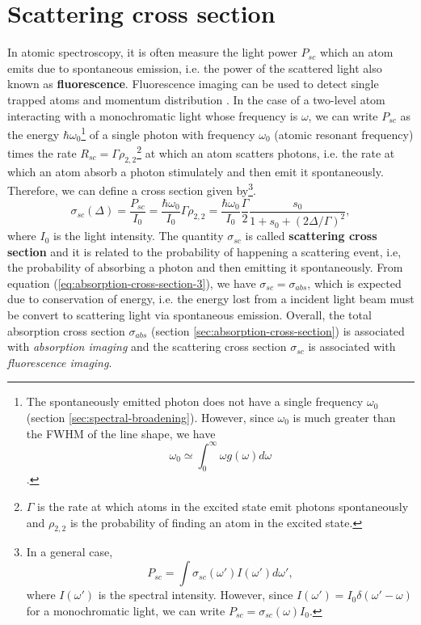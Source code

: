 %
\chapter{Scattering cross section}
\label{ap:scattering-cross-section}
%

In atomic spectroscopy, it is often measure the light power $ P_{sc} $ which an atom emits due to spontaneous emission, i.e. the power of the scattered light also known as \textbf{fluorescence}. Fluorescence imaging can be used to detect single trapped atoms \cite{kuhr2001deterministic} and momentum distribution \cite{fuhrmanek2010imaging, bucker2009single}. In the case of a two-level atom interacting with a monochromatic light whose frequency is $ \omega $, we can write $ P_{sc} $ as the energy $ \hbar \omega_0 $\footnote{The spontaneously emitted photon does not have a single frequency $ \omega_0 $ (section \ref{sec:spectral-broadening}). However, since $ \omega_0 $ is much greater than the FWHM of the line shape, we have $$ \omega_0 \simeq \int_{0}^{\infty} \omega g(\omega) d\omega $$.} of a single photon with frequency $ \omega_0 $ (atomic resonant frequency) times the rate $ R_{sc} = \Gamma \rho_{2,2} $\footnote{$ \Gamma $ is the rate at which atoms in the excited state emit photons spontaneously and $ \rho_{2,2} $ is the probability of finding an atom in the excited state.} at which an atom scatters photons, i.e. the rate at which an atom absorb a photon stimulately and then emit it spontaneously. Therefore, we can define a cross section given by\footnote{In a general case, $$ P_{sc} = \int \sigma_{sc}(\omega') I(\omega') d\omega', $$ where $ I(\omega') $ is the spectral intensity. However, since $ I(\omega')= I_0 \delta(\omega' - \omega) $ for a monochromatic light, we can write $  P_{sc} = \sigma_{sc}(\omega) I_0 $.}.
\begin{equation}
	\sigma_{sc}(\Delta) = \frac{P_{sc}}{I_0} =  \frac{\hbar \omega_0}{I_0} \Gamma \rho_{2,2} = \frac{\hbar \omega_0}{I_0} \frac{\Gamma}{2} \frac{s_0}{1 + s_0 + (2\Delta / \Gamma)^2},
	\label{eq:scattering-cross-section}
\end{equation}
where $ I_0 $ is the light intensity. The quantity $ \sigma_{sc} $ is called \textbf{scattering cross section} and it is related to the probability of happening a scattering event, i.e, the probability of absorbing a photon and then emitting it spontaneously. From equation (\ref{eq:absorption-cross-section-3}), we have $ \sigma_{sc} = \sigma_{abs} $, which is expected due to conservation of energy, i.e. the energy lost from a incident light beam must be convert to scattering light via spontaneous emission. Overall, the total absorption cross section $ \sigma_{abs} $ (section \ref{sec:absorption-cross-section}) is associated with \textit{absorption imaging} and the scattering cross section $ \sigma_{sc} $ is associated with \textit{fluorescence imaging}.
